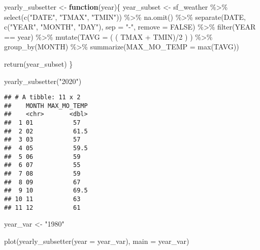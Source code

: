 \documentclass[
]{article}
\newenvironment{Shaded}{\begin{snugshade}}{\end{snugshade}}
\newcommand{\AttributeTok}[1]{\textcolor[rgb]{0.77,0.63,0.00}{#1}}
\newcommand{\ConstantTok}[1]{\textcolor[rgb]{0.00,0.00,0.00}{#1}}
\newcommand{\ControlFlowTok}[1]{\textcolor[rgb]{0.13,0.29,0.53}{\textbf{#1}}}
\newcommand{\DecValTok}[1]{\textcolor[rgb]{0.00,0.00,0.81}{#1}}
\newcommand{\FunctionTok}[1]{\textcolor[rgb]{0.00,0.00,0.00}{#1}}
\newcommand{\NormalTok}[1]{#1}
\newcommand{\OtherTok}[1]{\textcolor[rgb]{0.56,0.35,0.01}{#1}}
\newcommand{\SpecialCharTok}[1]{\textcolor[rgb]{0.00,0.00,0.00}{#1}}
\newcommand{\StringTok}[1]{\textcolor[rgb]{0.31,0.60,0.02}{#1}}
\begin{document}
\begin{Shaded}
\begin{Highlighting}[]
\NormalTok{yearly\_subsetter }\OtherTok{\textless{}{-}} \ControlFlowTok{function}\NormalTok{(year)\{}
\NormalTok{  year\_subset }\OtherTok{\textless{}{-}}\NormalTok{ sf\_weather }\SpecialCharTok{\%\textgreater{}\%}
  \FunctionTok{select}\NormalTok{(}\FunctionTok{c}\NormalTok{(}\StringTok{"DATE"}\NormalTok{, }\StringTok{"TMAX"}\NormalTok{, }\StringTok{"TMIN"}\NormalTok{)) }\SpecialCharTok{\%\textgreater{}\%}
  \FunctionTok{na.omit}\NormalTok{() }\SpecialCharTok{\%\textgreater{}\%}
  \FunctionTok{separate}\NormalTok{(DATE, }\FunctionTok{c}\NormalTok{(}\StringTok{"YEAR"}\NormalTok{, }\StringTok{"MONTH"}\NormalTok{, }\StringTok{"DAY"}\NormalTok{), }\AttributeTok{sep =} \StringTok{"{-}"}\NormalTok{, }\AttributeTok{remove =} \ConstantTok{FALSE}\NormalTok{) }\SpecialCharTok{\%\textgreater{}\%}
  \FunctionTok{filter}\NormalTok{(YEAR }\SpecialCharTok{==}\NormalTok{ year) }\SpecialCharTok{\%\textgreater{}\%}
  \FunctionTok{mutate}\NormalTok{(}\AttributeTok{TAVG =}\NormalTok{ ( ( TMAX }\SpecialCharTok{+}\NormalTok{ TMIN)}\SpecialCharTok{/}\DecValTok{2}\NormalTok{ ) ) }\SpecialCharTok{\%\textgreater{}\%}
  \FunctionTok{group\_by}\NormalTok{(MONTH) }\SpecialCharTok{\%\textgreater{}\%}
  \FunctionTok{summarize}\NormalTok{(}\AttributeTok{MAX\_MO\_TEMP =} \FunctionTok{max}\NormalTok{(TAVG))}
  
  \FunctionTok{return}\NormalTok{(year\_subset)}
\NormalTok{\}}

\FunctionTok{yearly\_subsetter}\NormalTok{(}\StringTok{"2020"}\NormalTok{)}
\end{Highlighting}
\end{Shaded}

\begin{verbatim}
## # A tibble: 11 x 2
##    MONTH MAX_MO_TEMP
##    <chr>       <dbl>
##  1 01           57  
##  2 02           61.5
##  3 03           57  
##  4 05           59.5
##  5 06           59  
##  6 07           55  
##  7 08           59  
##  8 09           67  
##  9 10           69.5
## 10 11           63  
## 11 12           61
\end{verbatim}

\begin{Shaded}
\begin{Highlighting}[]
\NormalTok{year\_var }\OtherTok{\textless{}{-}} \StringTok{"1980"}

\FunctionTok{plot}\NormalTok{(}\FunctionTok{yearly\_subsetter}\NormalTok{(}\AttributeTok{year =}\NormalTok{ year\_var), }\AttributeTok{main =}\NormalTok{ year\_var)}
\end{Highlighting}
\end{Shaded}
\end{document}
